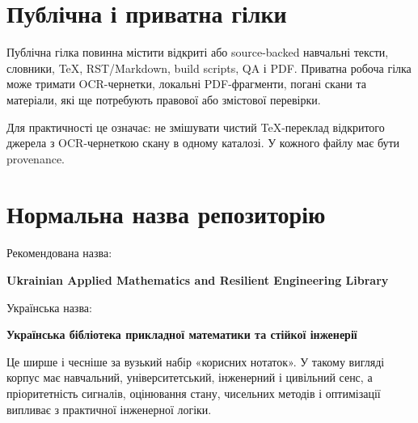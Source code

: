 \section{Публічна і приватна гілки}

Публічна гілка повинна містити відкриті або source-backed навчальні тексти, словники, TeX, RST/Markdown, build scripts, QA і PDF. Приватна робоча гілка може тримати OCR-чернетки, локальні PDF-фрагменти, погані скани та матеріали, які ще потребують правової або змістової перевірки.

Для практичності це означає: не змішувати чистий TeX-переклад відкритого джерела з OCR-чернеткою скану в одному каталозі. У кожного файлу має бути provenance.

\section{Нормальна назва репозиторію}

Рекомендована назва:

\begin{center}
\textbf{Ukrainian Applied Mathematics and Resilient Engineering Library}
\end{center}

Українська назва:

\begin{center}
\textbf{Українська бібліотека прикладної математики та стійкої інженерії}
\end{center}

Це ширше і чесніше за вузький набір «корисних нотаток». У такому вигляді корпус має навчальний, університетський, інженерний і цивільний сенс, а пріоритетність сигналів, оцінювання стану, чисельних методів і оптимізації випливає з практичної інженерної логіки.

